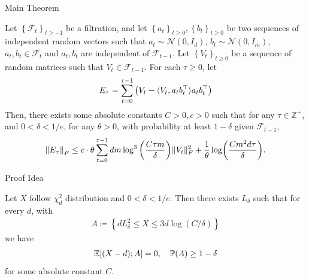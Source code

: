 \documentclass[10pt]{beamer}
\def\mbb#1{\mathbb{#1}}
\def\bZ{\mbb{Z}}
\newcommand{\mg}[1]{\| #1 \|}
\renewcommand{\P}{\mathbb P\qty}
\newcommand{\E}{\mathbb{E}\qty}
\newcommand{\1}{\mathbbm{1}}
\renewcommand{\set}[1]{\left\{#1\right\}}
\begin{document}
\begin{frame}{Main Theorem}
    \begin{theorem}\label{error_concentration}
        Let $\set{\mathcal F_t}_{t \geq -1}$ be a filtration, and let $\set{a_t}_{t \geq 0}, \set{b_t}_{t \geq 0} $ be two sequences of independent random vectors such that $a_t \sim \mathcal N(0, I_d)$, $b_t \sim \mathcal N(0, I_m)$, $a_t, b_t \in \mathcal F_t$ and $a_t, b_t$ are independent of $\mathcal F_{t-1}$. Let $\set{V_t}_{t \geq 0}$ be a sequence of random matrices such that $V_t \in \mathcal F_{t-1}$. For each $\tau \geq 0$, let 
        \begin{align*}
            E_\tau = \sum_{t=0}^{\tau-1} \qty(V_t - \langle V_t, a_tb_t^\top \rangle a_t b_t^\top)
        \end{align*}
        Then, there exists some absolute constants $C > 0, c > 0$ such that for any $\tau \in \bZ^+$, and $0 < \delta < 1/e$, for any $\theta > 0$, with probability at least $1-\delta$ given $\mathcal F_{t-1}$, 
        \begin{align*}
            \left \|E_{\tau} \right \|_F \leq c \cdot \theta \sum_{t=0}^{\tau-1} dm \log^{3}\qty(\frac{C\tau m}{\delta}) \mg{V_t}_F^2 + \frac{1}{\theta} \log(\frac{Cm^2d \tau}{\delta}).
        \end{align*}
    \end{theorem}
\end{frame}

\begin{frame}{Proof Idea}
    \begin{lemma}
        Let $X$ follow $\chi^2_d$ distribution and $0 < \delta < 1/e$. Then there exists $L_{\delta}$ such that for every $d$, with
        \begin{align*}
            A \coloneqq \set{dL_{\delta}^2 \leq X \leq 3d\log(C/\delta)}
        \end{align*}
        we have
        \begin{align*}
            \E[(X-d) ; A] = 0, \quad \P(A) \geq 1-\delta
        \end{align*}
        for some absolute constant $C$.
    \end{lemma}
\end{frame}
\end{document}
